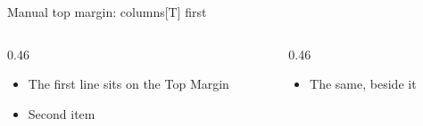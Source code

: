 \SMManualTopMargin
\begin{standardframe}{Manual top margin: columns[T] first}
	\begin{columns}[T,onlytextwidth]
		\begin{column}{0.46\linewidth}
			\begin{itemize}
				\item The first line sits on the Top Margin
				\item Second item
			\end{itemize}
		\end{column}
		\begin{column}{0.46\linewidth}
			\begin{itemize}
				\item The same, beside it
			\end{itemize}
		\end{column}
	\end{columns}
\end{standardframe}
